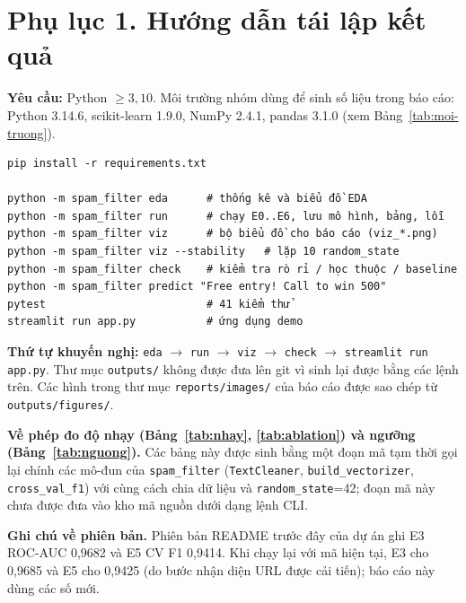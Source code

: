 \appendix
{}

\renewcommand{\thetable}{PL.\arabic{table}}
\renewcommand{\thefigure}{PL.\arabic{figure}}
\setcounter{table}{0}\setcounter{figure}{0}

\section*{Phụ lục 1. Hướng dẫn tái lập kết quả}

\textbf{Yêu cầu:} Python $\ge3{,}10$. Môi trường nhóm dùng để sinh số liệu trong báo cáo: Python 3.14.6, scikit-learn 1.9.0, NumPy 2.4.1, pandas 3.1.0 (xem Bảng~\ref{tab:moi-truong}).

\begin{verbatim}
pip install -r requirements.txt

python -m spam_filter eda      # thống kê và biểu đồ EDA
python -m spam_filter run      # chạy E0..E6, lưu mô hình, bảng, lỗi
python -m spam_filter viz      # bộ biểu đồ cho báo cáo (viz_*.png)
python -m spam_filter viz --stability   # lặp 10 random_state
python -m spam_filter check    # kiểm tra rò rỉ / học thuộc / baseline
python -m spam_filter predict "Free entry! Call to win 500"
pytest                         # 41 kiểm thử
streamlit run app.py           # ứng dụng demo
\end{verbatim}

\textbf{Thứ tự khuyến nghị:} \texttt{eda} $\to$ \texttt{run} $\to$ \texttt{viz} $\to$ \texttt{check} $\to$ \texttt{streamlit run app.py}. Thư mục \texttt{outputs/} không được đưa lên git vì sinh lại được bằng các lệnh trên. Các hình trong thư mục \texttt{reports/images/} của báo cáo được sao chép từ \texttt{outputs/figures/}.

\textbf{Về phép đo độ nhạy (Bảng~\ref{tab:nhay}, \ref{tab:ablation}) và ngưỡng (Bảng~\ref{tab:nguong}).} Các bảng này được sinh bằng một đoạn mã tạm thời gọi lại chính các mô-đun của \texttt{spam\_filter} (\texttt{TextCleaner}, \texttt{build\_vectorizer}, \texttt{cross\_val\_f1}) với cùng cách chia dữ liệu và \texttt{random\_state}=42; đoạn mã này chưa được đưa vào kho mã nguồn dưới dạng lệnh CLI.

\textbf{Ghi chú về phiên bản.} Phiên bản README trước đây của dự án ghi E3 ROC-AUC 0,9682 và E5 CV F1 0,9414. Khi chạy lại với mã hiện tại, E3 cho 0,9685 và E5 cho 0,9425 (do bước nhận diện URL được cải tiến); báo cáo này dùng các số mới.

